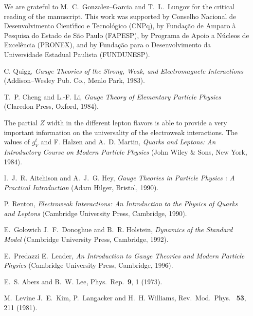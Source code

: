 \documentclass[12pt]{report}
\begin{document}
We are grateful to M.\ C.\ Gonzalez--Garcia and T.\ L.\ Lungov for
the critical reading of the manuscript. This work was supported by
Conselho Nacional de Desenvolvimento Cien\-t\'{\i}\-fi\-co e
Tecnol\'ogico (CNPq), by Funda\c{c}\~ao de Amparo \`a Pesquisa do
Estado de S\~ao Paulo (FAPESP), by Programa de Apoio a N\'ucleos de
Excel\^encia (PRONEX), and by Funda\c{c}\~ao para o Desenvolvimento
da Universidade Estadual Paulista (FUNDUNESP).     


\begin{thebibliography}{100}

C. Quigg, {\em Gauge Theories of the Strong, Weak, and Electromagnetc
  Interactions} (Addison--Wesley Pub. Co., Menlo Park, 1983).

T.~P. Cheng and L.-F. Li, {\em Gauge Theory of Elementary Particle Physics}
  (Claredon Press, Oxford, 1984).

The partial $Z$ width in the different lepton flavors is able to
provide a very important information on the universality of the
electroweak interactions. The values of $g_V^\ell$ and
F. Halzen and A.~D. Martin, {\em Quarks and Leptons: An Introductory Course on
  Modern Particle Physics} (John Wiley \& Sons, New York, 1984).

I.~J.~R. Aitchison and A.~J.~G. Hey, {\em Gauge Theories in Particle Physics :
  A Practical Introduction} (Adam Hilger, Bristol, 1990).

P. Renton, {\em Electroweak Interactions: An Introduction to the Physics of
  Quarks and Leptons} (Cambridge University Press, Cambridge, 1990).

E.~Golowich J.~F.~Donoghue and B.~R. Holstein, {\em Dynamics of the Standard
  Model} (Cambridge University Press, Cambridge, 1992).

E.~Predazzi E.~Leader, {\em An Introduction to Gauge Theories and Modern
  Particle Physics} (Cambridge University Press, Cambridge, 1996).

E.~S. Abers and B.~W. Lee, Phys.\ Rep.\ {\bf 9},  1  (1973).

M.~Levine J.~E.~Kim, P.~Langacker and H.~H. Williams, Rev.\ Mod.\ Phys.\ {\bf
  53},  211  (1981).


\end{thebibliography}
\end{document}
